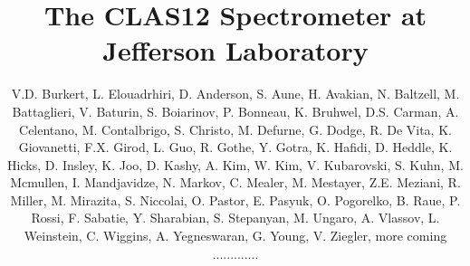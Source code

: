 \documentclass[final,3p,twocolumn]{elsarticle}
\begin{document}
\begin{frontmatter}

  \title{The CLAS12 Spectrometer at Jefferson Laboratory}
\author{V.D. Burkert, L. Elouadrhiri, D. Anderson, S. Aune, H. Avakian, N. Baltzell, M. Battaglieri,  V. Baturin,
  S. Boiarinov, P. Bonneau, K. Bruhwel, D.S. Carman, A. Celentano, M. Contalbrigo, S. Christo, M. Defurne, G. Dodge,
  R. De Vita, K. Giovanetti, F.X. Girod, L. Guo, R. Gothe, Y. Gotra, K. Hafidi, D. Heddle, K. Hicks, D. Insley, K. Joo,
  D. Kashy, A. Kim, W. Kim, V. Kubarovski, S. Kuhn, M. Mcmullen, I. Mandjavidze, N. Markov, C. Mealer, M. Mestayer,
  Z.E. Meziani, R. Miller, M. Mirazita, S. Niccolai, O. Pastor, E. Pasyuk, O. Pogorelko, B. Raue, P. Rossi, F. Sabatie,
  Y. Sharabian, S. Stepanyan, M. Ungaro, A. Vlassov, L. Weinstein, C. Wiggins, A. Yegneswaran, G. Young, V. Ziegler,
  more coming ............. }
\address{12000 Jefferson Avenue, Newport News, Virginia, 23606}
\address{ Argonne National Laboratory, Argonne, Illinois, 60439, USA}
\address{Christopher Newport University, Newport News, Virginia 23605, USA} 
\address{University of Connecticut, Storrs, Connecticut 06269, USA} 
\address{Florida International University, Miami, Florida, 33199, USA} 
\address{IRFU, CEA, Universit{\'e} Paris-Saclay, F-91191 Gif-sur-Yvette, France}
\address{INFN, Sezione di Genova, 16146 Genova, Italy}
\address{Institut de Physique Nucl{\'e}aire, IN2P3-CNRS, Universit{\'e} Paris-Sud,  Universit{\'e} Paris-Saclay,
}
\end{frontmatter}
\end{document}
